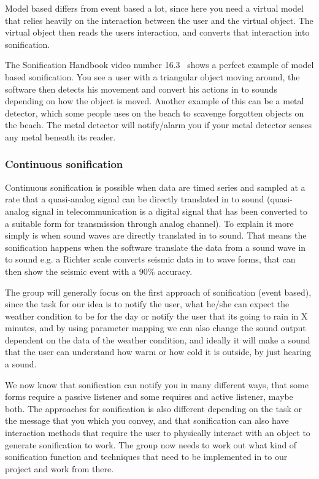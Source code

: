 Model based differs from event based a lot, since here you need a virtual model that relies heavily on the interaction between the user and the virtual object. 
The virtual object then reads the users interaction, and converts that interaction into sonification. 

The Sonification Handbook video number 16.3~\cite*[410]{Hermann2011} shows a perfect example of model based sonification. 
You see a user with a triangular object moving around, the software then detects his movement and convert his actions in to sounds depending on how the object is moved. 
Another example of this can be a metal detector, which some people uses on the beach to scavenge forgotten objects on the beach. 
The metal detector will notify/alarm you if your metal detector senses any metal beneath its reader. 



\subsubsection*{Continuous sonification} %
\label{ssub:continuous_sonification}

Continuous sonification is possible when data are timed series and sampled at a rate that a quasi-analog signal can be directly translated in to sound (quasi-analog signal in telecommunication is a digital signal that has been converted to a suitable form for transmission through analog channel). 
To explain it more simply is when sound waves are directly translated in to sound. 
That means the sonification happens when the software translate the data from a sound wave in to sound e.g. a Richter scale converts seismic data in to wave forms, that can then show the seismic event with a 90\% accuracy.



The group will generally focus on the first approach of sonification (event based), since the task for our idea is to notify the user, what he/she can expect the weather condition to be for the day or notify the user that its going to rain in X minutes, and by using parameter mapping we can also change the sound output dependent on the data of the weather condition, and ideally it will make a sound that the user can understand how warm or how cold it is outside, by just hearing a sound.



We now know that sonification can notify you in many different ways, that some forms require a passive listener and some requires and active listener, maybe both. 
The approaches for sonification is also different depending on the task or the message that you which you convey, and that sonification can also have interaction methods that require the user to physically interact with an object to generate sonification to work. 
The group now needs to work out what kind of sonification function and techniques that need to be implemented in to our project and work from there.

